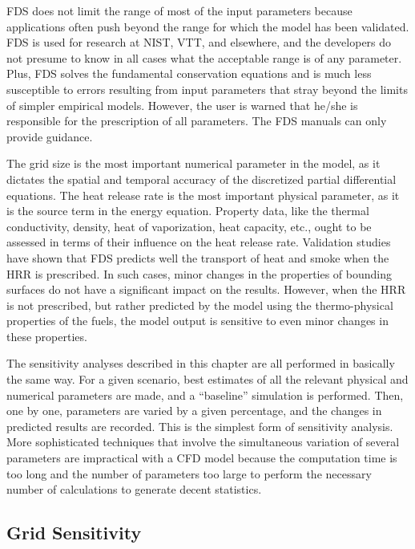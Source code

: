 \documentclass[11pt]{book}
\begin{document}
FDS does not  limit the range of most of  the input parameters because applications often push beyond the  range for which the model has been
validated.  FDS is used  for research at NIST, VTT, and elsewhere, and the developers do not presume to know in all cases what the acceptable range is
of any  parameter.  Plus,  FDS   solves  the  fundamental conservation  equations  and  is   much  less  susceptible  to  errors resulting
from  input parameters  that  stray  beyond  the limits  of simpler empirical models.  However, the user is warned  that he/she is responsible for
the prescription of all parameters.   The FDS manuals can only provide guidance.

The grid size is the  most important numerical parameter in the model, as it  dictates the spatial  and temporal accuracy of  the discretized partial
differential equations.  The heat  release rate  is  the most important physical parameter,  as it is the source  term in the energy equation.
Property data, like  the thermal conductivity, density, heat of vaporization,  heat capacity, etc., ought to be  assessed in terms of their
influence on  the heat release rate. Validation studies \cite{FDS_Validation_Guide} have shown that FDS predicts well the transport of heat and smoke when the HRR is prescribed.
In  such cases, minor changes in the properties of  bounding  surfaces  do  not  have  a  significant  impact  on  the results. However, when the HRR
is not prescribed, but rather predicted by the  model using  the thermo-physical properties  of the  fuels, the model output is sensitive to even
minor changes in these properties.

The sensitivity  analyses described in this chapter  are all performed in basically the same way. For a given scenario, best estimates of all the
relevant  physical  and  numerical  parameters are  made,  and  a ``baseline'' simulation is performed. Then, one by one, parameters are varied by a
given percentage, and the changes in predicted results are recorded.  This is  the simplest  form of  sensitivity  analysis. More sophisticated
techniques that involve  the simultaneous  variation of several  parameters  are impractical  with  a  CFD  model because  the computation time is
too long and the number of parameters too large to perform  the  necessary  number  of calculations  to  generate  decent statistics.



\subsection{Grid Sensitivity}
\end{document}
